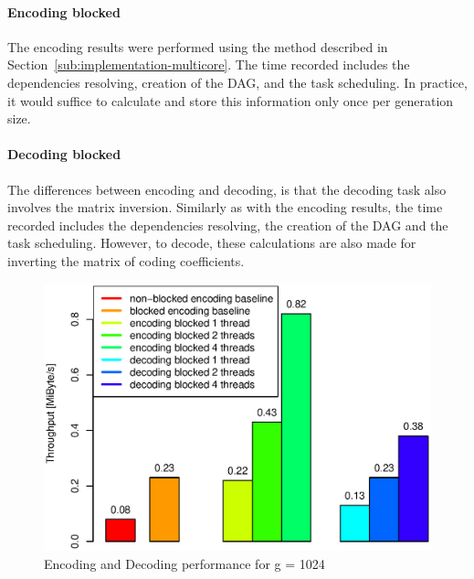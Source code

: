 \paragraph{Encoding blocked} The encoding results were performed using the
method described in Section~\ref{sub:implementation-multicore}. The time
recorded includes the dependencies resolving, creation of the \ac{DAG}, and the
task scheduling. In practice, it would suffice to calculate and store this
information only once per generation size.

\paragraph{Decoding blocked} The differences between encoding and decoding, is
that the decoding task also involves the matrix inversion. Similarly as with the
encoding results, the time recorded includes the dependencies resolving, the
creation of the \ac{DAG} and the task scheduling. However, to decode, these
calculations are also made for inverting the matrix of coding coefficients.

\begin{figure}[ht!]
\centering
\includegraphics[width=\columnwidth]{images/2015-04-18_encoding_decoding_1024.eps}
\caption{Encoding and Decoding performance for g = 1024}
\label{enc_dec1024}
\end{figure}

